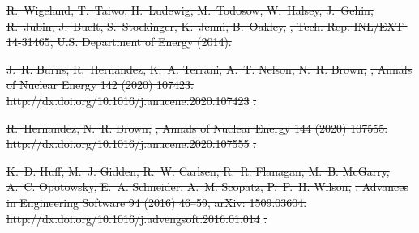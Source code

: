 \documentclass[preprint]{elsarticle}
\providecommand{\DIFdeltex}[1]{{\protect\color{red}\sout{#1}}}                      %
\providecommand{\DIFdel}[1]{\texorpdfstring{\DIFdeltex{#1}}{}} %
\begin{document}
\DIFdel{R.~Wigeland, T.~Taiwo, H.~Ludewig, M.~Todosow, W.~Halsey, J.~Gehin, R.~Jubin,
  J.~Buelt, S.~Stockinger, K.~Jenni, B.~Oakley,
  }%
\DIFdel{, Tech. Rep.
  INL/EXT-14-31465, U.S. Department of Energy (2014).
}%

\DIFdel{J.~R. Burns, R.~Hernandez, K.~A. Terrani, A.~T. Nelson, N.~R. Brown,
  }%
\DIFdel{, Annals of Nuclear Energy 142 (2020) 107423.
}%
\DIFdel{http://dx.doi.org/10.1016/j.anucene.2020.107423}%
\DIFdel{.
}%

\DIFdel{R.~Hernandez, N.~R. Brown,
  }%
\DIFdel{, Annals of Nuclear Energy 144 (2020) 107555.
}%
\DIFdel{http://dx.doi.org/10.1016/j.anucene.2020.107555}%
\DIFdel{.
}%

\DIFdel{K.~D. Huff, M.~J. Gidden, R.~W. Carlsen, R.~R. Flanagan, M.~B. McGarry, A.~C.
  Opotowsky, E.~A. Schneider, A.~M. Scopatz, P.~P.~H. Wilson,
  }%
\DIFdel{, Advances
  in Engineering Software 94 (2016) 46--59, arXiv: 1509.03604.
}%
\DIFdel{http://dx.doi.org/10.1016/j.advengsoft.2016.01.014}%
\DIFdel{.
}%
\end{document}
